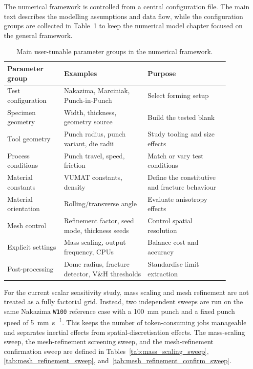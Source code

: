 The numerical framework is controlled from a central configuration file. The
main text describes the modelling assumptions and data flow, while the
configuration groups are collected in Table~\ref{tab:framework_parameters} to
keep the numerical model chapter
focused on the general framework.

\begin{table}[ht]
\centering
\begin{tabular}{@{}>{\raggedright\arraybackslash}p{0.23\linewidth}
>{\raggedright\arraybackslash}p{0.34\linewidth}
>{\raggedright\arraybackslash}p{0.33\linewidth}@{}}
\toprule[1.5pt]
Parameter group & Examples & Purpose \\ \midrule
Test configuration & Nakazima, Marciniak, Punch-in-Punch & Select forming setup \\
Specimen geometry & Width, thickness, geometry source & Build the tested blank \\
Tool geometry & Punch radius, punch variant, die radii & Study tooling and size effects \\
Process conditions & Punch travel, speed, friction & Match or vary test conditions \\
Material constants & 46 VUMAT constants, density & Define the constitutive and fracture behaviour \\
Material orientation & Rolling/transverse angle & Evaluate anisotropy effects \\
Mesh control & Refinement factor, seed mode, thickness seeds & Control spatial resolution \\
Explicit settings & Mass scaling, output frequency, CPUs & Balance cost and accuracy \\
Post-processing & Dome radius, fracture detector, V\&H thresholds & Standardise limit extraction \\ \bottomrule[1.5pt]
\end{tabular}
\caption{Main user-tunable parameter groups in the numerical framework.}
\label{tab:framework_parameters}
\end{table}

For the current scalar sensitivity study, mass scaling and mesh refinement are
not treated as a fully factorial grid. Instead, two independent sweeps are run
on the same Nakazima \texttt{W100} reference case with a \SI{100}{\milli\meter} punch
and a fixed punch speed of \SI{5}{\milli\meter\per\second}. This keeps the
number of  token-consuming jobs manageable and separates
inertial effects from spatial-discretisation effects. The mass-scaling sweep,
the mesh-refinement screening sweep, and the mesh-refinement confirmation
sweep are defined in Tables~\ref{tab:mass_scaling_sweep},
\ref{tab:mesh_refinement_sweep}, and~\ref{tab:mesh_refinement_confirm_sweep}.

